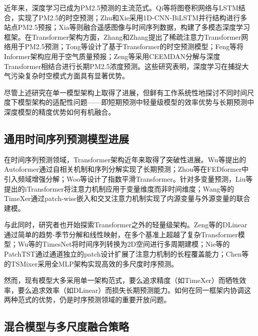 \documentclass[12pt,a4paper]{article}
\begin{document}
近年来，深度学习已成为PM2.5预测的主流范式。Qi等\cite{qi2019hybrid}将图卷积网络与LSTM结合，实现了PM2.5的时空预测；Zhu和Xie\cite{zhu2023investigation}采用1D-CNN-BiLSTM并行结构进行多站点PM2.5预报；Xia等\cite{xia2024multimodal}则融合遥感图像与时间序列数据，构建了多模态深度学习框架。在Transformer架构方面，Zhang和Zhang\cite{zhang2023modeling}提出了稀疏注意力Transformer网络用于PM2.5预测；Tong等\cite{tong2024robust}设计了基于Transformer的时空预测模型；Feng等\cite{feng2023spatiotemporal}将Informer架构应用于空气质量预报；Zeng等\cite{zeng2023ceemdan}采用CEEMDAN分解与深度Transformer相结合进行长期PM2.5浓度预测。这些研究表明，深度学习在捕捉大气污染复杂时空模式方面具有显著优势\cite{su2025systematic}。

尽管上述研究在单一模型架构上取得了进展，但鲜有工作系统性地探讨不同时间尺度下模型架构的适配性问题——即短期预测中轻量级模型的效率优势与长期预测中深度模型的精度优势如何有机融合。

\subsection{通用时间序列预测模型进展}

在时间序列预测领域，Transformer架构近年来取得了突破性进展。Wu等\cite{wu2021autoformer}提出的Autoformer通过自相关机制和序列分解实现了长期预测；Zhou等\cite{zhou2022fedformer}在FEDformer中引入频域增强分解；Woo等\cite{woo2022etsformer}设计了指数平滑Transformer。针对多变量预测，Liu等\cite{liu2023itransformer}提出的iTransformer将注意力机制应用于变量维度而非时间维度；Wang等\cite{wang2024timexer}的TimeXer通过patch-wise嵌入和交叉注意力机制实现了内源变量与外源变量的联合建模。

与此同时，研究者也开始探索Transformer之外的轻量级架构。Zeng等\cite{zeng2023transformers}的DLinear通过简单的趋势-季节分解和线性映射，在多个基准上超越了复杂Transformer模型；Wu等\cite{wu2023timesnet}的TimesNet将时间序列转换为2D空间进行多周期建模；Nie等\cite{nie2022time}的PatchTST通过通道独立的patch设计扩展了注意力机制的长程覆盖能力；Chen等\cite{chen2023tsmixer}的TSMixer采用全MLP架构实现高效的多尺度时序预测。

然而，现有模型大多采用单一架构范式，要么追求精度（如TimeXer）而牺牲效率，要么追求效率（如DLinear）而损失长期预测能力。如何在同一框架内协调这两种范式的优势，仍是时序预测领域的重要开放问题。

\subsection{混合模型与多尺度融合策略}
\end{document}
